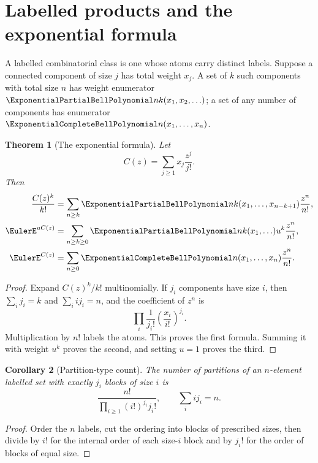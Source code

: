 \documentclass[11pt,a4paper,oneside,openany]{book}
\newtheorem{theorem}{Theorem}[chapter]
\newtheorem{corollary}[theorem]{Corollary}
\theoremstyle{definition}
\theoremstyle{remark}
\begin{document}
\section{Labelled products and the exponential formula}
A labelled combinatorial class is one whose atoms carry distinct labels.  Suppose a
connected component of size $j$ has total weight $x_j$.  A set of $k$ such components
with total size $n$ has weight enumerator $\ExponentialPartialBellPolynomial nk(x_1,x_2,\ldots)$; a set of any
number of components has enumerator $\ExponentialCompleteBellPolynomial n(x_1,\ldots,x_n)$.

\begin{theorem}[The exponential formula]\label{thm:exponential-formula}
Let
\[
 C(z)=\sum_{j\ge1}x_j\frac{z^j}{j!}.
\]
Then
\begin{align}
 \frac{C(z)^k}{k!}
  &=\sum_{n\ge k}\ExponentialPartialBellPolynomial nk(x_1,\ldots,x_{n-k+1})\frac{z^n}{n!},
  \label{eq:partial-bell-egf}\\
 \EulerE^{uC(z)}
  &=\sum_{n\ge k\ge0}\ExponentialPartialBellPolynomial nk(x_1,\ldots)u^k\frac{z^n}{n!},
  \label{eq:bivariate-bell-egf}\\
 \EulerE^{C(z)}
  &=\sum_{n\ge0}\ExponentialCompleteBellPolynomial n(x_1,\ldots,x_n)\frac{z^n}{n!}.
  \label{eq:complete-bell-egf}
\end{align}
\end{theorem}
\begin{proof}
Expand $C(z)^k/k!$ multinomially.  If $j_i$ components have size $i$, then
$\sum_i j_i=k$ and $\sum_iij_i=n$, and the coefficient of $z^n$ is
\[
 \prod_i\frac1{j_i!}\left(\frac{x_i}{i!}\right)^{j_i}.
\]
Multiplication by $n!$ labels the atoms.  This proves the first formula.  Summing it
with weight $u^k$ proves the second, and setting $u=1$ proves the third.
\end{proof}

\begin{corollary}[Partition-type count]\label{cor:partition-type}
The number of partitions of an $n$-element labelled set with exactly $j_i$ blocks of
size $i$ is
\begin{equation}\label{eq:partition-type-count}
 \frac{n!}{\prod_{i\ge1}(i!)^{j_i}j_i!},
 \qquad \sum_iij_i=n.
\end{equation}
\end{corollary}
\begin{proof}
Order the $n$ labels, cut the ordering into blocks of prescribed sizes, then divide
by $i!$ for the internal order of each size-$i$ block and by $j_i!$ for the order of
blocks of equal size.
\end{proof}
\end{document}
